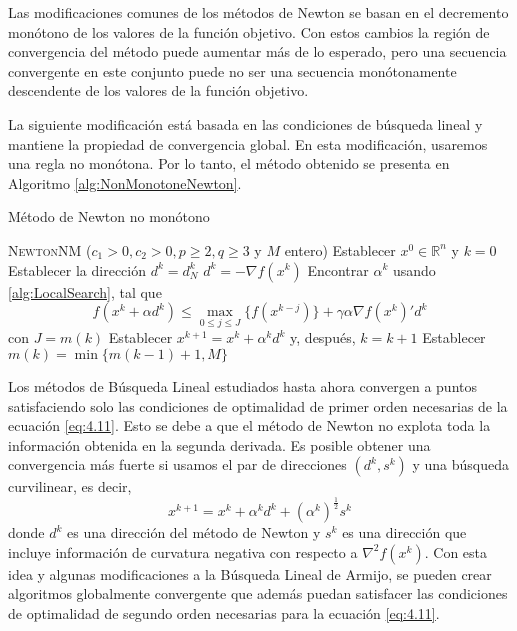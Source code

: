 Las modificaciones comunes de los métodos de Newton se basan en el decremento monótono de los valores de la función objetivo. 
Con estos cambios la región de convergencia del método puede aumentar más de lo esperado, pero una secuencia convergente en este conjunto puede no ser una secuencia monótonamente descendente de los valores de la función objetivo. 

La siguiente modificación está basada en las condiciones de búsqueda lineal y mantiene la propiedad de convergencia global. 
En esta modificación, usaremos una regla no monótona. 
Por lo tanto, el método obtenido se presenta en Algoritmo \ref{alg:NonMonotoneNewton}.

\begin{algorithm}
\caption{Método de Newton no monótono}\label{alg:NonMonotoneNewton}
\begin{algorithmic}[1]
\Procedure \textsc{NewtonNM} ($c_1>0,c_2>0,p\geq 2, q\geq 3$ y $M$ entero)
\State Establecer $x^0\in\mathbb{R}^n$ y $k=0$
		\State Establecer la dirección $d^k = d_N^k$
	\Else
		\State $d^k = -\nabla f(x^k)$
	\EndIf
	\State Encontrar $\alpha^k$ usando \ref{alg:LocalSearch}, tal que \begin{equation*}
	f(x^k+\alpha d^k) \leq \max_{0\leq j\leq J}\{f(x^{k-j})\}+\gamma\alpha\nabla f(x^k)'d^k
	\end{equation*}
	con $J=m(k)$
	\State Establecer $x^{k+1} = x^k+\alpha^kd^k$ y, después, $k=k+1$
	\State Establecer $m(k) = \min\{m(k-1)+1,M\}$
\EndWhile
\EndProcedure
\end{algorithmic}
\end{algorithm}

Los métodos de Búsqueda Lineal estudiados hasta ahora convergen a puntos satisfaciendo solo las condiciones de optimalidad de primer orden necesarias de la ecuación \ref{eq:4.11}. 
Esto se debe a que el método de Newton no explota toda la información obtenida en la segunda derivada. 
Es posible obtener una convergencia más fuerte si usamos el par de direcciones $(d^k,s^k)$ y una búsqueda curvilinear, es decir,
\begin{equation}
x^{k+1} = x^k + \alpha^kd^k+(\alpha^k)^{\frac{1}{2}}s^k
\label{eq:4.25}
\end{equation}
donde $d^k$ es una dirección del método de Newton y $s^k$ es una dirección que incluye información de curvatura negativa con respecto a $\nabla^2 f(x^k)$. 
Con esta idea y algunas modificaciones a la Búsqueda Lineal de Armijo, se pueden crear algoritmos globalmente convergente que además puedan satisfacer las condiciones de optimalidad de segundo orden necesarias para la ecuación \ref{eq:4.11}.

